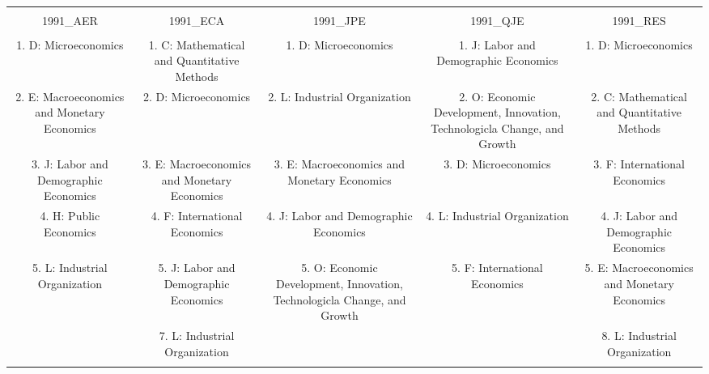 
\begin{table}[!htbp] \centering 
  \caption{} 
  \label{} 
\begin{tabular}{@{\extracolsep{5pt}} ccccc} 
\\[-1.8ex]\hline 
\hline \\[-1.8ex] 
1991\_AER & 1991\_ECA & 1991\_JPE & 1991\_QJE & 1991\_RES \\ 
\hline \\[-1.8ex] 
1. D: Microeconomics & 1. C: Mathematical and Quantitative Methods & 1. D: Microeconomics & 1. J: Labor and Demographic Economics & 1. D: Microeconomics \\ 
2. E: Macroeconomics and Monetary Economics & 2. D: Microeconomics & 2. L: Industrial Organization & 2. O: Economic Development, Innovation, Technologicla Change, and Growth & 2. C: Mathematical and Quantitative Methods \\ 
3. J: Labor and Demographic Economics & 3. E: Macroeconomics and Monetary Economics & 3. E: Macroeconomics and Monetary Economics & 3. D: Microeconomics & 3. F: International Economics \\ 
4. H: Public Economics & 4. F: International Economics & 4. J: Labor and Demographic Economics & 4. L: Industrial Organization & 4. J: Labor and Demographic Economics \\ 
5. L: Industrial Organization & 5. J: Labor and Demographic Economics & 5. O: Economic Development, Innovation, Technologicla Change, and Growth & 5. F: International Economics & 5. E: Macroeconomics and Monetary Economics \\ 
 & 7. L: Industrial Organization &  &  & 8. L: Industrial Organization \\ 
\hline \\[-1.8ex] 
\end{tabular} 
\end{table} 
